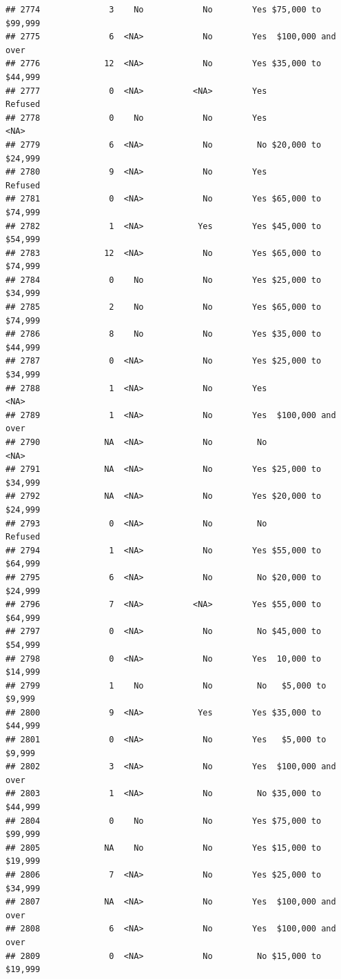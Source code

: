\documentclass[man]{apa6}
\begin{document}
\begin{verbatim}
## 2774              3    No            No        Yes $75,000 to $99,999
## 2775              6  <NA>            No        Yes  $100,000 and over
## 2776             12  <NA>            No        Yes $35,000 to $44,999
## 2777              0  <NA>          <NA>        Yes            Refused
## 2778              0    No            No        Yes               <NA>
## 2779              6  <NA>            No         No $20,000 to $24,999
## 2780              9  <NA>            No        Yes            Refused
## 2781              0  <NA>            No        Yes $65,000 to $74,999
## 2782              1  <NA>           Yes        Yes $45,000 to $54,999
## 2783             12  <NA>            No        Yes $65,000 to $74,999
## 2784              0    No            No        Yes $25,000 to $34,999
## 2785              2    No            No        Yes $65,000 to $74,999
## 2786              8    No            No        Yes $35,000 to $44,999
## 2787              0  <NA>            No        Yes $25,000 to $34,999
## 2788              1  <NA>            No        Yes               <NA>
## 2789              1  <NA>            No        Yes  $100,000 and over
## 2790             NA  <NA>            No         No               <NA>
## 2791             NA  <NA>            No        Yes $25,000 to $34,999
## 2792             NA  <NA>            No        Yes $20,000 to $24,999
## 2793              0  <NA>            No         No            Refused
## 2794              1  <NA>            No        Yes $55,000 to $64,999
## 2795              6  <NA>            No         No $20,000 to $24,999
## 2796              7  <NA>          <NA>        Yes $55,000 to $64,999
## 2797              0  <NA>            No         No $45,000 to $54,999
## 2798              0  <NA>            No        Yes  10,000 to $14,999
## 2799              1    No            No         No   $5,000 to $9,999
## 2800              9  <NA>           Yes        Yes $35,000 to $44,999
## 2801              0  <NA>            No        Yes   $5,000 to $9,999
## 2802              3  <NA>            No        Yes  $100,000 and over
## 2803              1  <NA>            No         No $35,000 to $44,999
## 2804              0    No            No        Yes $75,000 to $99,999
## 2805             NA    No            No        Yes $15,000 to $19,999
## 2806              7  <NA>            No        Yes $25,000 to $34,999
## 2807             NA  <NA>            No        Yes  $100,000 and over
## 2808              6  <NA>            No        Yes  $100,000 and over
## 2809              0  <NA>            No         No $15,000 to $19,999

\end{verbatim}
\end{document}

